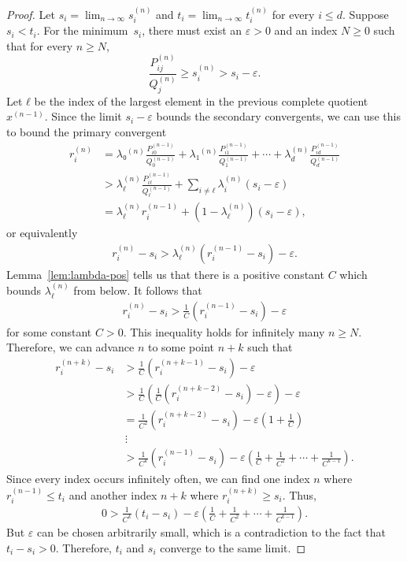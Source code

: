 \begin{proof}
  Let $s_i = \lim_{n → ∞} s_i^{(n)}$
  and $t_i = \lim_{n → ∞} t_i^{(n)}$ for every $i ≤ d$.
  Suppose $s_i < t_i$.
  For the minimum~$s_i$, there must exist an $ε > 0$ and an index $N ≥ 0$ such
  that for every $n ≥ N$,
  \[
    \frac{P_{ij}^{(n)}}{Q_j^{(n)}} ≥ s_i^{(n)} > s_i - ε.
  \]
  Let $ℓ$ be the index of the largest element in the previous complete quotient $x^{(n-1)}$.
  Since the limit $s_i - ε$ bounds the secondary convergents,
  we can use this to bound the primary convergent
  \begin{align*}
    r_i^{(n)}
    & = λ₀^{(n)} \frac{P_{i0}^{(n-1)}}{Q_0^{(n-1)}} + λ₁^{(n)} \frac{P_{i1}^{(n-1)}}{Q_1^{(n-1)}} + ⋯ + λ_d^{(n)} \frac{P_{id}^{(n-1)}}{Q_d^{(n-1)}} \\
    & > λ_ℓ^{(n)} \frac{P_{iℓ}^{(n-1)}}{Q_ℓ^{(n-1)}} + \sum_{i ≠ ℓ} λ_i^{(n)} (s_i - ε) \\
    & = λ_ℓ^{(n)} r_i^{(n-1)} + (1 - λ_ℓ^{(n)}) (s_i - ε),
  \end{align*}
  or equivalently
  \begin{align*}
    r_i^{(n)} - s_i > λ_ℓ^{(n)} \left( r_i^{(n-1)} - s_i \right) - ε.
  \end{align*}
  Lemma~\ref{lem:lambda-pos} tells us that there is a positive constant $C$
  which bounds $λ_ℓ^{(n)}$ from below.
  It follows that
  \begin{align*}
    r_i^{(n)} - s_i > \frac{1}{C} \left( r_i^{(n-1)} - s_i \right) - ε
  \end{align*}
  for some constant $C > 0$.
  This inequality holds for infinitely many $n ≥ N$.
  Therefore, we can advance $n$ to some point $n + k$
  such that
  \begin{align*}
    r_i^{(n+k)} - s_i
    & > \frac{1}{C} \left( r_i^{(n+k-1)} - s_i \right) - ε \\
    & > \frac{1}{C} \left(\frac{1}{C} \left( r_i^{(n+k-2)} - s_i \right) - ε\right) - ε \\
    & = \frac{1}{C^2} \left(r_i^{(n+k-2)} - s_i \right) - ε\left(1 + \frac{1}{C}\right) \\
    & \, ⋮ \\
    & > \frac{1}{C^k} \left( r_i^{(n-1)} - s_i \right) - ε\left( \frac{1}{C} + \frac{1}{C^2} + ⋯ + \frac{1}{C^{k-1}} \right).
  \end{align*}
  Since every index occurs infinitely often,
  we can find one index $n$ where $r_i^{(n-1)} ≤ t_i$
  and another index $n+k$ where $r_i^{(n+k)} ≥ s_i$.
  Thus,
  \begin{align*}
    0 > \frac{1}{C^k} \left( t_i - s_i \right) - ε\left( \frac{1}{C} + \frac{1}{C^2} + ⋯ + \frac{1}{C^{k-1}} \right).
  \end{align*}
  But $ε$ can be chosen arbitrarily small,
  which is a contradiction to the fact that $t_i - s_i > 0$.
  Therefore, $t_i$ and $s_i$ converge to the same limit.
\end{proof}

